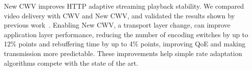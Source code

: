 \documentclass[10pt,sigconf]{acmart}
\begin{document}
New CWV improves HTTP adaptive streaming playback stability. We compared video delivery with CWV and New CWV, and validated the results shown by previous work~\cite{Nazir-2014-performance-evaluation-congestion-window-validation-dash-newcwv}. Enabling New CWV, a transport layer change, can improve application layer performance, reducing the number of encoding switches by up to 12\% points and rebuffering time by up to 4\% points, improving QoE and making transmission more predictable. These improvements help simple rate adaptation algorithms compete with the state of the art.  








\ifpdf
  \ifdefined\pdftrailerid
    \pdftrailerid{}
  \fi
\fi


\end{document}
